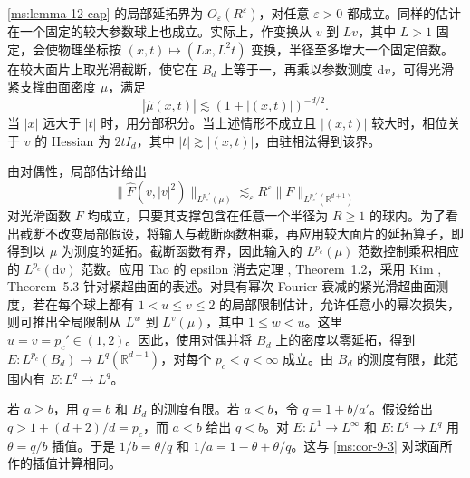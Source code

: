 \ref{ms:lemma-12-cap} 的局部延拓界为 $O_\varepsilon(R^\varepsilon)$，对任意 $\varepsilon>0$ 都成立。同样的估计在一个固定的较大参数球上也成立。实际上，作变换从 $v$ 到 $Lv$，其中 $L>1$ 固定，会使物理坐标按 $(x,t)\mapsto (Lx,L^2t)$ 变换，半径至多增大一个固定倍数。在较大面片上取光滑截断，使它在 $B_d$ 上等于一，再乘以参数测度 $\mathrm dv$，可得光滑紧支撑曲面密度 $\mu$，满足
\[
|\widehat\mu(x,t)|\lesssim (1+|(x,t)|)^{-d/2}.
\]
当 $|x|$ 远大于 $|t|$ 时，用分部积分。当上述情形不成立且 $|(x,t)|$ 较大时，相位关于 $v$ 的 Hessian 为 $2t I_d$，其中 $|t|\gtrsim |(x,t)|$，由驻相法得到该界。

由对偶性，局部估计给出
\[
\|\widehat F(v,|v|^2)\|_{L^{p_c'}(\mu)}
 \lesssim_\varepsilon R^\varepsilon\|F\|_{L^{p_c'}(\mathbb R^{d+1})}
\]
对光滑函数 $F$ 均成立，只要其支撑包含在任意一个半径为 $R\geq1$ 的球内。为了看出截断不改变局部假设，将输入与截断函数相乘，再应用较大面片的延拓算子，即得到以 $\mu$ 为测度的延拓。截断函数有界，因此输入的 $L^{p_c}(\mu)$ 范数控制乘积相应的 $L^{p_c}(\mathrm dv)$ 范数。应用 Tao 的 epsilon 消去定理 \cite{r-75}, Theorem~1.2，采用 Kim \cite{r-46}, Theorem~5.3 针对紧超曲面的表述。对具有幂次 Fourier 衰减的紧光滑超曲面测度，若在每个球上都有 $1<u\leq v\leq 2$ 的局部限制估计，允许任意小的幂次损失，则可推出全局限制从 $L^w$ 到 $L^v(\mu)$，其中 $1\leq w<u$。这里 $u=v=p_c'\in(1,2)$。因此，使用对偶并将 $B_d$ 上的密度以零延拓，得到 $E:L^{p_c}(B_d)\to L^q(\mathbb R^{d+1})$，对每个 $p_c<q<\infty$ 成立。由 $B_d$ 的测度有限，此范围内有 $E:L^q\to L^q$。

若 $a\geq b$，用 $q=b$ 和 $B_d$ 的测度有限。若 $a<b$，令 $q=1+b/a'$。假设给出 $q>1+(d+2)/d=p_c$，而 $a<b$ 给出 $q<b$。对 $E:L^1\to L^\infty$ 和 $E:L^q\to L^q$ 用 $\theta=q/b$ 插值。于是 $1/b=\theta/q$ 和 $1/a=1-\theta+\theta/q$。这与 \ref{ms:cor-9-3} 对球面所作的插值计算相同。
